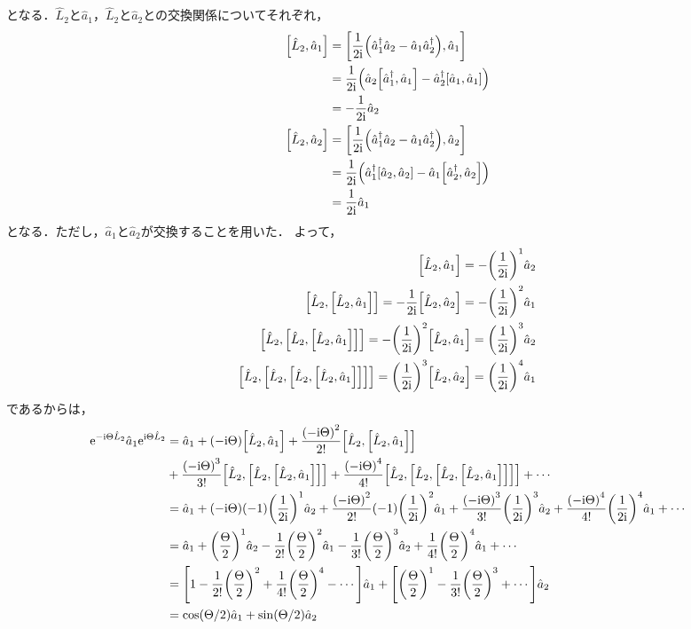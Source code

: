 \documentclass{report}
\begin{document}
    となる．$\hat{L}_2$と$\hat{a}_1$，$\hat{L}_2$と$\hat{a}_2$との交換関係についてそれぞれ，
    \begin{align}
      \qty[\hat{L}_2, \hat{a}_1] &= \qty[\frac{1}{2\mathrm{i}}\qty(\hat{a}_1^{\dag}\hat{a}_2 - \hat{a}_1\hat{a}_2^{\dag}), \hat{a}_1] \\ 
      &= \frac{1}{2\mathrm{i}}\qty(\hat{a}_2\qty[\hat{a}_1^{\dag}, \hat{a}_1] - \hat{a}_2^{\dag}\qty[\hat{a}_1, \hat{a}_1]) \\ 
      &= -\frac{1}{2\mathrm{i}}\hat{a}_2 \label{commute-l2a1}\\ 
      \qty[\hat{L}_2, \hat{a}_2] &= \qty[\frac{1}{2\mathrm{i}}\qty(\hat{a}_1^{\dag}\hat{a}_2 - \hat{a}_1\hat{a}_2^{\dag}), \hat{a}_2] \\ 
      &= \frac{1}{2\mathrm{i}}\qty(\hat{a}_1^{\dag}\qty[\hat{a}_2, \hat{a}_2] - \hat{a}_1\qty[\hat{a}_2^{\dag}, \hat{a}_2]) \\ 
      &= \frac{1}{2\mathrm{i}}\hat{a}_1 \label{commute-l2a2}
    \end{align}
    となる．ただし，$\hat{a}_1$と$\hat{a}_2$が交換することを用いた．
    よって，
    \begin{align}
      \qty[\hat{L}_2, \hat{a}_1] = -\qty(\frac{1}{2\mathrm{i}})^1\hat{a}_2 \\ 
      \qty[\hat{L}_2, \qty[\hat{L}_2, \hat{a}_1]] = -\frac{1}{2\mathrm{i}}\qty[\hat{L}_2, \hat{a}_2] = -\qty(\frac{1}{2\mathrm{i}})^2\hat{a}_1 \\ 
      \qty[\hat{L}_2, \qty[\hat{L}_2, \qty[\hat{L}_2, \hat{a}_1]]] = -\qty(\frac{1}{2\mathrm{i}})^2\qty[\hat{L}_2, \hat{a}_1] = \qty(\frac{1}{2\mathrm{i}})^3\hat{a}_2 \\ 
      \qty[\hat{L}_2, \qty[\hat{L}_2, \qty[\hat{L}_2, \qty[\hat{L}_2, \hat{a}_1]]]] = \qty(\frac{1}{2\mathrm{i}})^3\qty[\hat{L}_2, \hat{a}_2] = \qty(\frac{1}{2\mathrm{i}})^4\hat{a}_1 
    \end{align}
    であるからは，
    \begin{align}
      \mathrm{e}^{-\mathrm{i}\Theta\hat{L}_2}\hat{a}_1\mathrm{e}^{\mathrm{i}\Theta\hat{L}_2} &= \hat{a}_1 + \qty(-\mathrm{i}\Theta)\qty[\hat{L}_2, \hat{a}_1] + \frac{\qty(-\mathrm{i}\Theta)^2}{2!}\qty[\hat{L}_2, \qty[\hat{L}_2, \hat{a}_1]]\notag \\ 
      &+ \frac{\qty(-\mathrm{i}\Theta)^3}{3!}\qty[\hat{L}_2, \qty[\hat{L}_2, \qty[\hat{L}_2, \hat{a}_1]]] + \frac{\qty(-\mathrm{i}\Theta)^4}{4!}\qty[\hat{L}_2, \qty[\hat{L}_2, \qty[\hat{L}_2, \qty[\hat{L}_2, \hat{a}_1]]]] + \cdots \\ 
      &= \hat{a}_1 + \qty(-\mathrm{i}\Theta)\qty(-1)\qty(\frac{1}{2\mathrm{i}})^1\hat{a}_2 + \frac{\qty(-\mathrm{i}\Theta)^2}{2!}\qty(-1)\qty(\frac{1}{2\mathrm{i}})^2\hat{a}_1 + \frac{\qty(-\mathrm{i}\Theta)^3}{3!}\qty(\frac{1}{2\mathrm{i}})^3\hat{a}_2 + \frac{\qty(-\mathrm{i}\Theta)^4}{4!}\qty(\frac{1}{2\mathrm{i}})^4\hat{a}_1 + \cdots \\ 
      &= \hat{a}_1 + \qty(\frac{\Theta}{2})^1\hat{a}_2 - \frac{1}{2!}\qty(\frac{\Theta}{2})^2\hat{a}_1 - \frac{1}{3!}\qty(\frac{\Theta}{2})^3\hat{a}_2 + \frac{1}{4!}\qty(\frac{\Theta}{2})^4\hat{a}_1 + \cdots \\ 
      &= \qty[1 - \frac{1}{2!}\qty(\frac{\Theta}{2})^2 + \frac{1}{4!}\qty(\frac{\Theta}{2})^4 - \cdots]\hat{a}_1 + \qty[\qty(\frac{\Theta}{2})^1 - \frac{1}{3!}\qty(\frac{\Theta}{2})^3 + \cdots]\hat{a}_2 \\ 
      &= \cos(\Theta / 2)\hat{a}_1 + \sin(\Theta / 2)\hat{a}_2
    \end{align}
\end{document}
